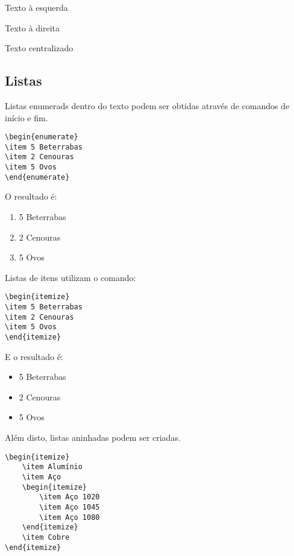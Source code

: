 \begin{flushleft}
Texto à esquerda
\end{flushleft}

\begin{flushright}
Texto à direita
\end{flushright}

\begin{center}
Texto centralizado
\end{center}

\subsection{Listas}
\label{listas}
Listas enumerads dentro do texto podem ser obtidas através de comandos de início e fim.
\begin{verbatim}
\begin{enumerate}
\item 5 Beterrabas
\item 2 Cenouras
\item 5 Ovos
\end{enumerate}
\end{verbatim}

O resultado é:

\begin{enumerate}
\item 5 Beterrabas
\item 2 Cenouras
\item 5 Ovos
\end{enumerate}

Listas de itens utilizam o comando:

\begin{verbatim}
\begin{itemize}
\item 5 Beterrabas
\item 2 Cenouras
\item 5 Ovos
\end{itemize}
\end{verbatim}

E o resultado é:

\begin{itemize}
\item 5 Beterrabas
\item 2 Cenouras
\item 5 Ovos
\end{itemize}

Além disto, listas aninhadas podem ser criadas.

\begin{verbatim}
\begin{itemize}
    \item Alumínio
    \item Aço
    \begin{itemize}
        \item Aço 1020
        \item Aço 1045
        \item Aço 1080
    \end{itemize}
    \item Cobre
\end{itemize}
\end{verbatim}

